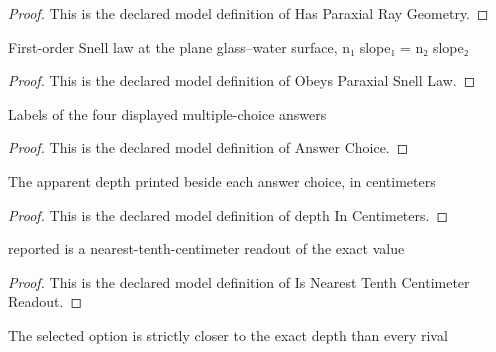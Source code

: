 \begin{proof}
  This is the declared model definition of Has Paraxial Ray Geometry.
\end{proof}
\begin{definition}
  \label{def:physics:phyx-mini-0158:phyxminiproblems-problemphyxmini0158-obeysparaxialsnelllaw}
  First-order Snell law at the plane glass--water surface, n₁ slope₁ = n₂ slope₂
\end{definition}
\begin{proof}
  This is the declared model definition of Obeys Paraxial Snell Law.
\end{proof}
\begin{definition}
  \label{def:physics:phyx-mini-0158:phyxminiproblems-problemphyxmini0158-answerchoice}
  Labels of the four displayed multiple-choice answers
\end{definition}
\begin{proof}
  This is the declared model definition of Answer Choice.
\end{proof}
\begin{definition}
  \label{def:physics:phyx-mini-0158:phyxminiproblems-problemphyxmini0158-answerchoice-depthincentimeters}
  The apparent depth printed beside each answer choice, in centimeters
\end{definition}
\begin{proof}
  This is the declared model definition of depth In Centimeters.
\end{proof}
\begin{definition}
  \label{def:physics:phyx-mini-0158:phyxminiproblems-problemphyxmini0158-isnearesttenthcentimeterreadout}
  reported is a nearest-tenth-centimeter readout of the exact value
\end{definition}
\begin{proof}
  This is the declared model definition of Is Nearest Tenth Centimeter Readout.
\end{proof}
\begin{definition}
  \label{def:physics:phyx-mini-0158:phyxminiproblems-problemphyxmini0158-isclosestdepthanswer}
  The selected option is strictly closer to the exact depth than every rival
\end{definition}
